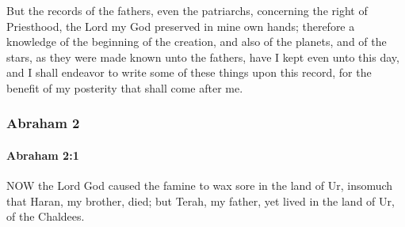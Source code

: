 			But the records of the fathers, even the patriarchs, concerning the right of Priesthood, the Lord my God preserved in mine own hands; therefore a knowledge of the beginning of the creation, and also of the planets, and of the stars, as they were made known unto the fathers, have I kept even unto this day, and I shall endeavor to write some of these things upon this record, for the benefit of my posterity that shall come after me.

		
	\subsubsection{Abraham 2} %
		\label{ABRAHAM-2}
		
		\paragraph{Abraham 2:1} %
			\label{ABRAHAM-2-1}

			NOW the Lord God caused the famine to wax sore in the land of Ur, insomuch that Haran, my brother, died; but Terah, my father, yet lived in the land of Ur, of the Chaldees.


